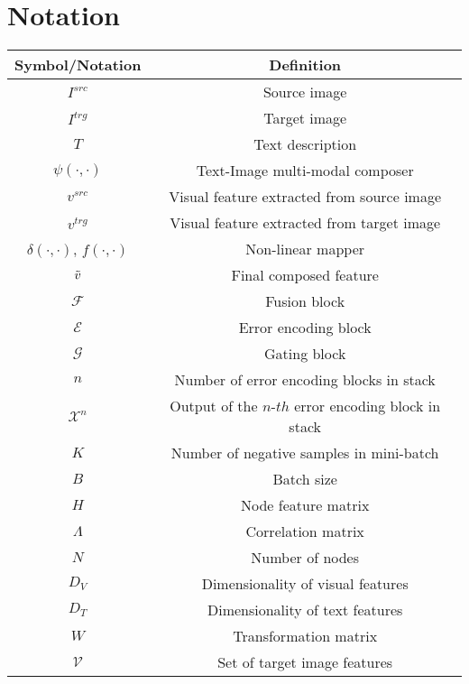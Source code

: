 \documentclass[10pt,twocolumn,letterpaper]{article}
\begin{document}
{\small


}

\newpage
\appendix

\section{Notation}
\begin{table}[H]
    \centering
    \begin{adjustbox}{width=0.45\textwidth}
    \begin{tabular}{cc}
        \toprule
        Symbol/Notation & Definition \\ 
        \hline \hline
        $I^{src}$ & Source image \\ 
        $I^{trg}$ & Target image \\
        $T$ & Text description \\
        $\psi(\cdot, \cdot)$ & Text-Image multi-modal composer \\
        $v^{src}$ & Visual feature extracted from source image \\
        $v^{trg}$ & Visual feature extracted from target image \\
        $\delta(\cdot, \cdot)$, $f(\cdot, \cdot)$ & Non-linear mapper \\
        $\Tilde{v}$ & Final composed feature \\
        $\mathcal{F}$ & Fusion block \\
        $\mathcal{E}$ & Error encoding block \\
        $\mathcal{G}$ & Gating block \\
        $n$ & Number of error encoding blocks in stack \\
        $\mathcal{X}^n$ & Output of the $n$-$th$ error encoding block in stack \\
        $K$ & Number of negative samples in mini-batch \\
        $B$ & Batch size \\
        $H$ & Node feature matrix \\
        $\Lambda$ & Correlation matrix \\
        $N$ & Number of nodes \\
        $D_V$ & Dimensionality of visual features \\
        $D_T$ & Dimensionality of text features \\
        $W$ & Transformation matrix \\
        $\mathcal{V}$ & Set of target image features \\

\end{tabular}
\end{adjustbox}
\end{table}
\end{document}
